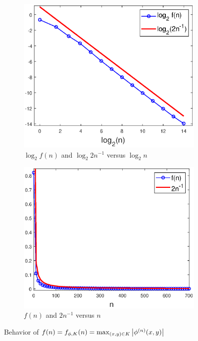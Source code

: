 \documentclass[11pt]{article}
\newenvironment{example}
  {\pushQED{\qed}\renewcommand{\qedsymbol}{$\triangle$}\examplex}
  {\popQED\endexamplex}
\theoremstyle{remark}
\begin{document}
\begin{example}
\begin{figure}[!htb]
    \begin{subfigure}{0.49\textwidth}
    \centering
    \includegraphics[scale=0.58]{Fig5a.eps}
    \caption{$\log_2 f(n)$ and $\log_2 2n^{-1}$ versus $\log_2 n$}
    \end{subfigure}
    \begin{subfigure}{0.49\textwidth}
    \centering
    \includegraphics[scale=0.58]{Fig5b.eps}
    \caption{$f(n)$ and $2n^{-1}$ versus $n$}
    \end{subfigure}
    \caption{Behavior of $f(n)=f_{\phi,K}(n)=\max_{(x,y)\in K}\abs{\phi^{(n)}(x,y)}$}
    \label{fig:Conv_Pwr_0}
\end{figure}





\end{example}
\end{document}
